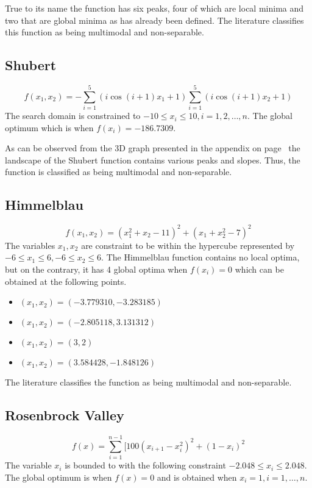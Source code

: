 True to its name the function has six peaks, four of which are local minima and two that are global minima as has already been defined. The literature classifies this function as being multimodal and non-separable\cite{ABCCompareStudy,TestFunctions}.
\subsection{Shubert}
\begin{equation}
	f(x_1,x_2) = -\sum_{i = 1}^5 (i\cos{(i +1)x_1 + 1})\sum_{i=1}^5 (i\cos{(i+1)x_2 + 1})
\end{equation}
The search domain is constrained to $-10 \leq x_i \leq 10, i = 1,2, \ldots, n$\cite{ABCCompareStudy,TSGlobalOptimization,ContinACSTS,TestFunctions}. The global optimum which is when $f(x_i) = -186.7309$\cite{ABCCompareStudy,TSGlobalOptimization,ContinACSTS,TestFunctions}. 

As can be observed from the 3D graph presented in the appendix on page~\pageref{fig:ShubertGraph} the landscape of the Shubert function contains various peaks and slopes. Thus, the function is classified as being multimodal and non-separable\cite{ABCCompareStudy,TestFunctions}.
\subsection{Himmelblau}
\begin{equation}
	f(x_1,x_2) = (x_1^2 + x_2 - 11)^2 + (x_1 + x_2^2 - 7)^2
\end{equation}
The variables $x_1,x_2$ are constraint to be within the hypercube represented by $-6 \leq x_1 \leq 6, -6 \leq x_2 \leq 6$\cite{TestFunctions,ABCCompareStudy}. The Himmelblau function contains no local optima, but on the contrary, it has 4 global optima when $f(x_i) = 0$ which can be obtained at the following points\cite{TestFunctions,ABCCompareStudy}.
\begin{itemize}
\item $(x_1,x_2) = (-3.779310,-3.283185)$
\item $(x_1,x_2) = (-2.805118,3.131312)$
\item $(x_1,x_2) = (3,2)$
\item $(x_1,x_2) = (3.584428,-1.848126)$
\end{itemize}
The literature classifies the function as being multimodal and non-separable\cite{TestFunctions,ABCCompareStudy}.
\subsection{Rosenbrock Valley}
\begin{equation}
	f(x) = \sum_{i=1}^{n-1}[100(x_{i+1} - x_i^2)^2 + (1-x_i)^2
\end{equation}
The variable $x_i$ is bounded to with the following constraint $ -2.048 \leq x_i \leq 2.048 $\cite{numericalABC,ABCCompareStudy,ARPSO,PerfABC,TSGlobalOptContinFunc,HybridIntelliGA}. The global optimum is when $f(x) = 0$ and is obtained when $x_i = 1, i = 1,\ldots,n$\cite{numericalABC,ABCCompareStudy,ARPSO,TSGlobalOptContinFunc,HybridIntelliGA}.

